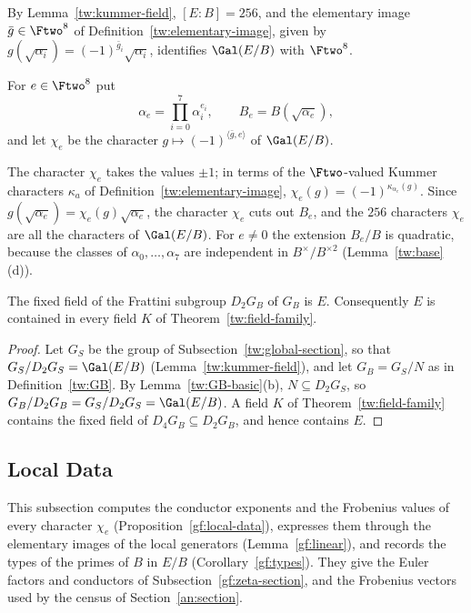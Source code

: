 By Lemma~\ref{tw:kummer-field}, $[E:B]=256$, and the elementary image
$\bar g\in\Ftwo^8$ of Definition~\ref{tw:elementary-image}, given by
$g(\sqrt{\alpha_i})=(-1)^{\bar g_i}\sqrt{\alpha_i}$, identifies $\Gal(E/B)$
with $\Ftwo^8$.

\begin{definition}\label{gf:characters}
For $e\in\Ftwo^8$ put
\[
 \alpha_e=\prod_{i=0}^7\alpha_i^{e_i},\qquad B_e=B(\sqrt{\alpha_e}),
\]
and let $\chi_e$ be the character $g\mapsto(-1)^{\langle\bar g,e\rangle}$ of
$\Gal(E/B)$.
\end{definition}

The character $\chi_e$ takes the values $\pm1$; in terms of the
$\Ftwo$-valued Kummer characters $\kappa_a$ of
Definition~\ref{tw:elementary-image}, $\chi_e(g)=(-1)^{\kappa_{\alpha_e}(g)}$.
Since $g(\sqrt{\alpha_e})=\chi_e(g)\sqrt{\alpha_e}$,
the character $\chi_e$ cuts out $B_e$, and the $256$ characters $\chi_e$ are
all the characters of $\Gal(E/B)$. For $e\ne0$ the extension $B_e/B$ is
quadratic, because the classes of $\alpha_0,\ldots,\alpha_7$ are independent
in $B^\times/B^{\times2}$ (Lemma~\ref{tw:base}(d)).

\begin{lemma}\label{gf:in-tower}
The fixed field of the Frattini subgroup $D_2G_B$ of $G_B$ is $E$.
Consequently $E$ is contained in every field $K$ of
Theorem~\ref{tw:field-family}.
\end{lemma}

\begin{proof}
Let $G_S$ be the group of Subsection~\ref{tw:global-section}, so
that $G_S/D_2G_S=\Gal(E/B)$ (Lemma~\ref{tw:kummer-field}), and let
$G_B=G_S/N$ as in Definition~\ref{tw:GB}. By Lemma~\ref{tw:GB-basic}(b),
$N\subseteq D_2G_S$, so
$G_B/D_2G_B=G_S/D_2G_S=\Gal(E/B)$. A field $K$ of
Theorem~\ref{tw:field-family} contains the fixed field of
$D_4G_B\subseteq D_2G_B$, and hence contains $E$.
\end{proof}

\subsection{Local Data}\label{gf:local-section}
This subsection computes the conductor exponents and the Frobenius values of
every character $\chi_e$ (Proposition~\ref{gf:local-data}), expresses them
through the elementary images of the local generators
(Lemma~\ref{gf:linear}), and records the types of the primes of $B$ in $E/B$
(Corollary~\ref{gf:types}). They give the Euler factors and conductors of
Subsection~\ref{gf:zeta-section}, and the Frobenius vectors used by the
census of Section~\ref{an:section}.

